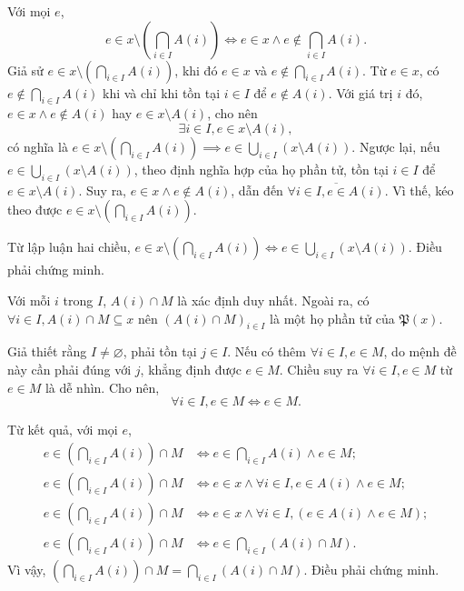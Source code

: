 \stepSubexercise Với mọi $e$, \begin{equation*}
   e \in x \setminus \left(\bigcap_{i \in I}A(i)\right) \iff e \in x \land e \notin \bigcap_{i \in I}A(i).
\end{equation*}
Giả sử $e \in x \setminus \left(\bigcap_{i \in I}A(i)\right)$, khi đó $e \in x$ và $e \notin \bigcap_{i \in I}A(i)$. Từ $e \in x$, có $e \notin \bigcap_{i \in I}A(i)$ khi và chỉ khi tồn tại $i \in I$ để $e \notin A(i)$. Với giá trị $i$ đó, $e \in x \land e \notin A(i)$ hay $e \in x \setminus A(i)$, cho nên \begin{equation*}
   \exists i \in I, e \in x \setminus A(i),
\end{equation*}
có nghĩa là $e \in x \setminus \left(\bigcap_{i \in I}A(i)\right) \implies e \in \bigcup_{i \in I} \left(x \setminus A(i)\right)$. Ngược lại, nếu $e \in \bigcup_{i \in I} \left(x \setminus A(i)\right)$, theo định nghĩa hợp của họ phần tử, tồn tại $i \in I$ để $e \in x \setminus A(i)$. Suy ra, $e \in x \land e \notin A(i)$, dẫn đến $\overline{\forall i \in I, e \in A(i)}$. Vì thế, kéo theo được $e \in x \setminus \left(\bigcap_{i \in I}A(i)\right)$. 

Từ lập luận hai chiều, $e \in x \setminus \left(\bigcap_{i \in I}A(i)\right) \iff e \in \bigcup_{i \in I} \left(x \setminus A(i)\right)$. Điều phải chứng minh.

\stepSubexercise Với mỗi $i$ trong $I$, $A(i) \cap M$ là xác định duy nhất. Ngoài ra, có $\forall i \in I, A(i) \cap M \subseteq x$ nên $\left(A(i) \cap M\right)_{i \in I}$ là một họ phần tử của $\mathfrak{P}(x)$.

Giả thiết rằng $I \neq \varnothing$, phải tồn tại $j \in I$. Nếu có thêm $\forall i \in I, e \in M$, do mệnh đề này cần phải đúng với $j$, khẳng định được $e \in M$. Chiều suy ra $\forall i \in I, e \in M$ từ $e \in M$ là dễ nhìn. Cho nên, \begin{equation*}
   \forall i \in I, e \in M \iff e \in M.
\end{equation*}

Từ kết quả, với mọi $e$, \begin{align*}
   e \in \left(\bigcap_{i \in I} A(i)\right) \cap M &\iff e \in \bigcap_{i \in I} A(i) \land e \in M; \\
   e \in \left(\bigcap_{i \in I} A(i)\right) \cap M &\iff e \in x \land \forall i \in I, e \in A(i) \land e \in M; \\
   e \in \left(\bigcap_{i \in I} A(i)\right) \cap M &\iff e \in x \land \forall i \in I, \left(e \in A(i) \land e \in M\right); \\
   e \in \left(\bigcap_{i \in I} A(i)\right) \cap M &\iff e \in \bigcap_{i \in I} \left(A(i) \cap M\right).
\end{align*}
Vì vậy, $\left(\bigcap_{i \in I} A(i)\right) \cap M = \bigcap_{i \in I} \left(A(i) \cap M\right)$. Điều phải chứng minh.

